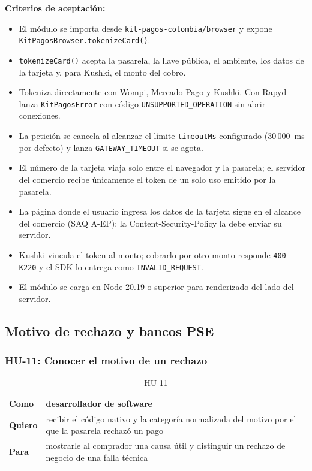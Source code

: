 \textbf{Criterios de aceptación:}
\begin{itemize}
  \item El módulo se importa desde \texttt{kit-pagos-colombia/browser} y expone \texttt{KitPagosBrowser.tokenizeCard()}.
  \item \texttt{tokenizeCard()} acepta la pasarela, la llave pública, el ambiente, los datos de la tarjeta y, para Kushki, el monto del cobro.
  \item Tokeniza directamente con Wompi, Mercado Pago y Kushki. Con Rapyd lanza \texttt{KitPagosError} con código \texttt{UNSUPPORTED\_OPERATION} sin abrir conexiones.
  \item La petición se cancela al alcanzar el límite \texttt{timeoutMs} configurado (30\,000~ms por defecto) y lanza \texttt{GATEWAY\_TIMEOUT} si se agota.
  \item El número de la tarjeta viaja solo entre el navegador y la pasarela; el servidor del comercio recibe únicamente el token de un solo uso emitido por la pasarela.
  \item La página donde el usuario ingresa los datos de la tarjeta sigue en el alcance del comercio (SAQ A-EP): la Content-Security-Policy la debe enviar su servidor.
  \item Kushki vincula el token al monto; cobrarlo por otro monto responde \texttt{400 K220} y el SDK lo entrega como \texttt{INVALID\_REQUEST}.
  \item El módulo se carga en Node 20.19 o superior para renderizado del lado del servidor.
\end{itemize}

\subsection{Motivo de rechazo y bancos PSE}

\subsubsection{HU-11: Conocer el motivo de un rechazo}
\begin{table}[H]
  \centering
  \renewcommand{\arraystretch}{1.2}
  \begin{tabularx}{\textwidth}{|l|X|}
    \hline
    \textbf{Como} & desarrollador de software \\
    \hline
    \textbf{Quiero} & recibir el código nativo y la categoría normalizada del motivo por el que la pasarela rechazó un pago \\
    \hline
    \textbf{Para} & mostrarle al comprador una causa útil y distinguir un rechazo de negocio de una falla técnica \\
    \hline
  \end{tabularx}
  \caption{HU-11}
  \label{tab:hu-11}
\end{table}

